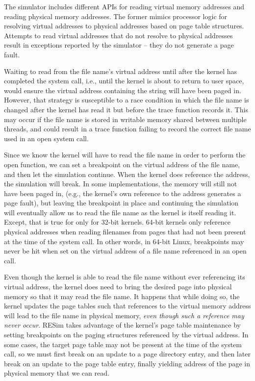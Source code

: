 \documentclass[titlepage]{article}
\begin{document}
\begin{appendices}
The simulator includes different APIs for reading virtual memory addresses and reading physical memory addresses.
The former mimics processor logic for resolving virtual addresses to physical addresses based on page table
structures. Attempts to read virtual addresses that do not resolve to physical addresses result in exceptions reported
by the simulator -- they do not generate a page fault.

Waiting to read from the file name's virtual address until after the kernel has completed the system call, i.e.,
until the kernel is about to return to user space, would ensure the virtual address containing the string
will have been paged in.  However, that strategy is susceptible to a race condition in which the file
name is changed after the kernel has read it but before the trace function records it.  This may occur
if the file name is stored in writable memory shared between multiple threads, and could result in a trace function
failing to record the correct file name used in an open system call.
 
Since we know the kernel will have to read the file name in order to perform the open function, we
can set a breakpoint on the virtual address of the file name, and then let the simulation continue. 
When the kernel does reference the address, the simulation will break.  In some implementations, the
memory will still not have been paged in, (e.g., the kernel's own reference to the address generates a page fault),
but leaving the breakpoint in place and continuing the simulation
will eventually allow us to read the file name as the kernel is itself reading it.  Except, that is true for only 
for 32-bit kernels.  64-bit kernels only reference physical addresses when reading filenames from pages that had
not been present at the time of the system call.  In other words,
in 64-bit Linux, breakpoints may never be hit when set on the virtual address of a file name referenced in an open call.

Even though the kernel is able to read the file name without ever referencing its virtual address, the kernel does
need to bring the desired page into physical memory so that it may read the file name.  It happens that while doing so, the kernel
updates the page tables such that references to the virtual memory address will lead to the file name in
physical memory, \textit{even though such a reference may never occur}.  RESim takes advantage of the kernel's
page table maintenance by setting breakpoints on the paging structures referenced by the virtual address.
In some cases, the target page table may not be present at the time of the system call, so we must first
break on an update to a page directory entry, and then later break on an update to the page table entry,
finally yielding address of the page in physical memory that we can read.


\end{appendices}
\end{document}
